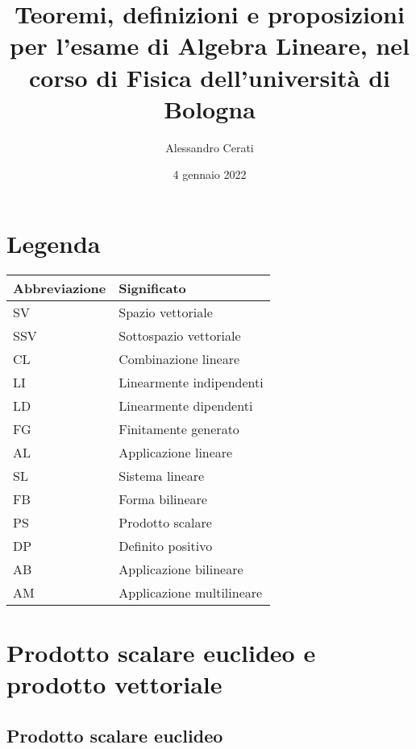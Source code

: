 \documentclass[]{article}
\theoremstyle{definition}
\theoremstyle{definition}
\theoremstyle{definition}
\begin{document}
\title{Teoremi, definizioni e proposizioni per l'esame di Algebra Lineare, nel corso di Fisica dell'università di Bologna}
\author{Alessandro Cerati}
\date{4 gennaio 2022}
\maketitle

\tableofcontents
\newpage

\section{Legenda}
\begin{tabular}{ll}
Abbreviazione	& 	Significato \\
\toprule
SV				&	Spazio vettoriale \\
SSV				& 	Sottospazio vettoriale \\
CL				& 	Combinazione lineare \\
LI				&	Linearmente indipendenti \\
LD				& 	Linearmente dipendenti \\
FG 				&	Finitamente generato \\
AL				& 	Applicazione lineare \\
SL				& 	Sistema lineare \\
FB				& 	Forma bilineare \\
PS				& 	Prodotto scalare \\
DP				& 	Definito positivo \\
AB				& 	Applicazione bilineare \\
AM				&	Applicazione multilineare\\
\end{tabular}

\section{Prodotto scalare euclideo e prodotto vettoriale}

\subsection{Prodotto scalare euclideo}
\end{document}
